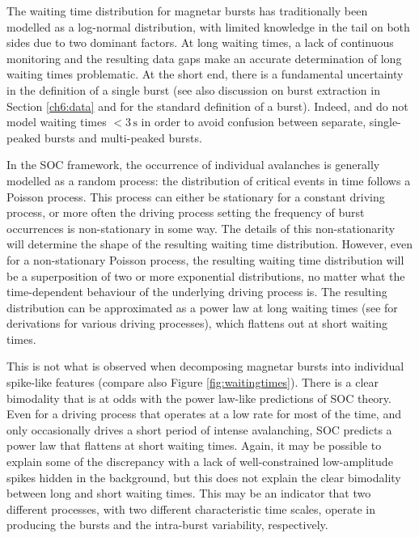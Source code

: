 \documentclass[12pt]{emulateapj}
\begin{document}
The waiting time distribution for magnetar bursts has traditionally been modelled as a log-normal distribution, with limited knowledge 
in the tail on both sides due to two dominant factors. At long waiting times, a lack of continuous monitoring and the resulting data gaps
make an accurate determination of long waiting times problematic. At the short end, there is a fundamental uncertainty in the definition of 
a single burst (see also discussion on burst extraction in Section \ref{ch6:data} and \citealp{vanderhorst2012} for the standard definition of a burst). 
Indeed, \citet{gogus1999}  and \citet{gogus2000} do not model waiting times $<3\,\mathrm{s}$ in order to avoid confusion between 
separate, single-peaked bursts and multi-peaked bursts. 

In the SOC framework, the occurrence of individual avalanches is generally modelled as a random process: the distribution of critical events in time
follows a Poisson process. This process can either be stationary for a constant driving process, or more often the driving process setting the frequency
of burst occurrences is non-stationary in some way. The details of this non-stationarity will determine the shape of the resulting waiting time distribution.
However, even for a non-stationary Poisson process, the resulting waiting time distribution will be a superposition of two or more exponential distributions,
no matter what the time-dependent behaviour of the underlying driving process is. The resulting distribution 
can be approximated as a power law at long waiting times (see \citealp{aschwanden2011} for derivations for various driving processes), which flattens out at 
short waiting times. 

This is not what is observed when decomposing magnetar bursts into individual spike-like features (compare also Figure \ref{fig:waitingtimes}). There is a
clear bimodality that is at odds with the power law-like predictions of SOC theory. Even for a driving process that operates at a low
rate for most of the time, and only occasionally drives a short period of intense avalanching, SOC predicts a power law that flattens at short
waiting times. Again, it may be possible to explain some of the discrepancy with a lack of well-constrained low-amplitude spikes hidden in 
the background, but this does not explain the clear bimodality between long and short waiting times. This may be an indicator that two different
processes, with two different characteristic time scales, operate in producing the bursts and the intra-burst variability, respectively. 
\end{document}
